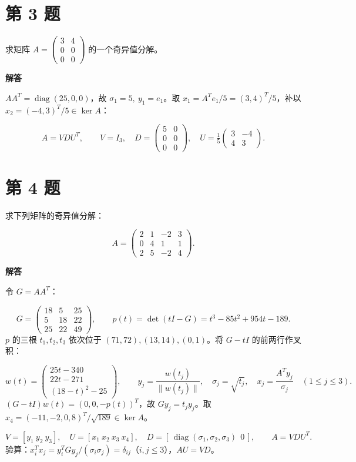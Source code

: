 \documentclass[UTF8,10pt,letterpaper,fontset=fandol]{ctexart}
\begin{document}
\section{第 3 题}
求矩阵 $A=\left(\begin{smallmatrix}3&4\\0&0\\0&0\end{smallmatrix}\right)$ 的一个奇异值分解。\par
\par{}\textbf{解答}\par
$AA^T=\operatorname{diag}(25,0,0)$，故 $\sigma_1=5,\ y_1=e_1$。取 $x_1=A^Te_1/5=(3,4)^T/5$，补以 $x_2=(-4,3)^T/5\in\ker A$：\par
\[
 \boxed{A=VDU^T},\qquad V=I_3,\quad
 D=\begin{pmatrix}5&0\\0&0\\0&0\end{pmatrix},\quad
 U=\tfrac15\begin{pmatrix}3&-4\\4&3\end{pmatrix}.
\]
\section{第 4 题}
求下列矩阵的奇异值分解：\par
\[
 A=\begin{pmatrix}2&1&-2&3\\0&4&1&1\\2&5&-2&4\end{pmatrix}.
\]
\par{}\textbf{解答}\par
令 $G=AA^T$：\par
\[
G=\begin{pmatrix}18&5&25\\5&18&22\\25&22&49\end{pmatrix},
\qquad p(t)=\det(tI-G)=t^3-85t^2+954t-189 .
\]
$p$ 的三根 $t_1,t_2,t_3$ 依次位于 $(71,72),(13,14),(0,1)$。将 $G-tI$ 的前两行作叉积：\par
\[
 w(t)=\begin{pmatrix}25t-340\\22t-271\\(18-t)^2-25\end{pmatrix},\qquad
 y_j=\frac{w(t_j)}{\|w(t_j)\|},\quad
 \sigma_j=\sqrt{t_j},\quad x_j=\frac{A^Ty_j}{\sigma_j}\quad(1\le j\le3).
\]
$(G-tI)w(t)=(0,0,-p(t))^T$，故 $Gy_j=t_jy_j$。取 $x_4=(-11,-2,0,8)^T/\sqrt{189}\in\ker A$。\par
\[
 V=[y_1\ y_2\ y_3],\quad U=[x_1\ x_2\ x_3\ x_4],\quad
 D=[\,\operatorname{diag}(\sigma_1,\sigma_2,\sigma_3)\ \ 0\,],\qquad \boxed{A=VDU^T}.
\]
验算：$x_i^Tx_j=y_i^TGy_j/(\sigma_i\sigma_j)=\delta_{ij}$（$i,j\le3$），$AU=VD$。\par
\newpage
\end{document}
